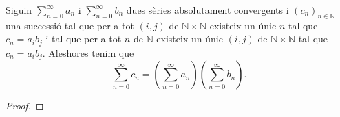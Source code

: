 \documentclass[../../Main.tex]{subfiles}
\begin{document}
	\begin{theorem}
		\label{Teorema de Cauchy}\label{thm:Teorema de Cauchy}
		Siguin \(\sum_{n=0}^{\infty}a_{n}\) i \(\sum_{n=0}^{\infty}b_{n}\) dues sèries absolutament convergents i \((c_{n})_{n\in\mathbb{N}}\) una successió tal que per a tot \((i,j)\) de \(\mathbb{N}\times\mathbb{N}\) existeix un únic \(n\) tal que \(c_{n}=a_{i}b_{j}\) i tal que per a tot \(n\) de \(\mathbb{N}\) existeix un únic \((i,j)\) de \(\mathbb{N}\times\mathbb{N}\) tal que \(c_{n}=a_{i}b_{j}\). Aleshores tenim que
		\[\sum_{n=0}^{\infty}c_{n}=\left(\sum_{n=0}^{\infty}a_{n}\right)\left(\sum_{n=0}^{\infty}b_{n}\right).\]
		\begin{proof} %
		\begin{comment}
			Per la proposició \myref{prop:una sèrie absolutament convergent és convergent} tenim que les sèries \(\sum_{n=0}^{\infty}a_{n}\) i \(\sum_{n=0}^{\infty}b_{n}\) són convergents, i per tant tenim que la successió
			\[p_{N}=\left(\sum_{n=0}^{N}a_{n}\right)\left(\sum_{n=0}^{N}b_{n}\right)\]
			és convergent.
			
			Com que per hipòtesi les sèries \(\sum_{n=0}^{\infty}a_{n}\) i \(\sum_{n=0}^{\infty}b_{n}\) són absolutament convergents, per la definició de \myref{def:convergència absoluta d'una sèrie}, trobem que les sèries \(\sum_{n=0}^{\infty}\abs{a_{n}}\) i \(\sum_{n=0}^{\infty}\abs{b_{n}}\) són convergents, i per tant tenim que la successió
			\[p_{N}=\sum_{n=0}^{N}\abs{a_{n}}\sum_{n=0}^{N}\abs{b_{n}}\]
			és convergent.
			
			Per la definició de \myref{def:límit} trobem que per a tot \(\varepsilon>0\) existeix un natural \(n_{0}\) tal que per a tot \(N\geq n_{0}\) es satisfà
			\begin{equation}
				\label{thm:Teorema de Cauchy:eq1}
				\abs{\sum_{n=0}^{N}\abs{a_{n}}\sum_{n=0}^{N}\abs{b_{n}}-\sum_{n=0}^{\infty}\abs{a_{n}}\sum_{n=0}^{\infty}\abs{b_{n}}}\leq\frac{\varepsilon}{2},
			\end{equation}
			i per \eqref{thm:Teorema de Cauchy:eq1} tenim que per a tot \(N\geq n_{0}\) es satisfà
			\begin{equation}
				\label{thm:Teorema de Cauchy:eq3}
				\sum_{n=N}^{\infty}\abs{a_{n}}\sum_{n=N}^{\infty}\abs{b_{n}}\leq\frac{\varepsilon}{2}.
			\end{equation}
			
			
			
			Com que per hipòtesi les sèries \(\sum_{n=0}^{\infty}a_{n}\) i \(\sum_{n=0}^{\infty}b_{n}\) són absolutament convergents, per la proposició \myref{prop:una sèrie absolutament convergent és convergent} tenim que les sèries \(\sum_{n=0}^{\infty}a_{n}\) i \(\sum_{n=0}^{\infty}b_{n}\) són convergents, i per la definició de \myref{def:sèrie convergent} trobem que la successió
			\[p_{N}=\sum_{n=0}^{N}a_{n}\sum_{n=0}^{N}b_{n}\]
			és convergent.
			

\end{comment}
\end{proof}
\end{theorem}
\end{document}
